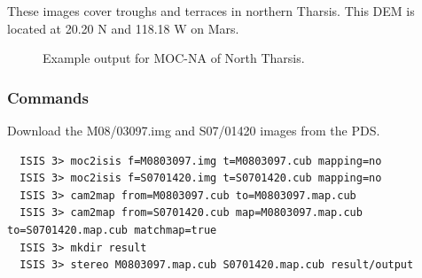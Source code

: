 These images cover troughs and terraces in northern Tharsis. 
This \ac{DEM} is located at 20.20 N and 118.18 W on Mars.

\begin{figure}[h!]
\centering
  \hfil
\caption{Example output for MOC-NA of North Tharsis.}
\label{fig:mocna_n_tharsis_example}
\end{figure}

\subsubsection*{Commands}

Download the M08/03097.img and S07/01420 images from the \ac{PDS}.
\begin{verbatim}
  ISIS 3> moc2isis f=M0803097.img t=M0803097.cub mapping=no
  ISIS 3> moc2isis f=S0701420.img t=S0701420.cub mapping=no
  ISIS 3> cam2map from=M0803097.cub to=M0803097.map.cub
  ISIS 3> cam2map from=S0701420.cub map=M0803097.map.cub to=S0701420.map.cub matchmap=true
  ISIS 3> mkdir result
  ISIS 3> stereo M0803097.map.cub S0701420.map.cub result/output
\end{verbatim}

